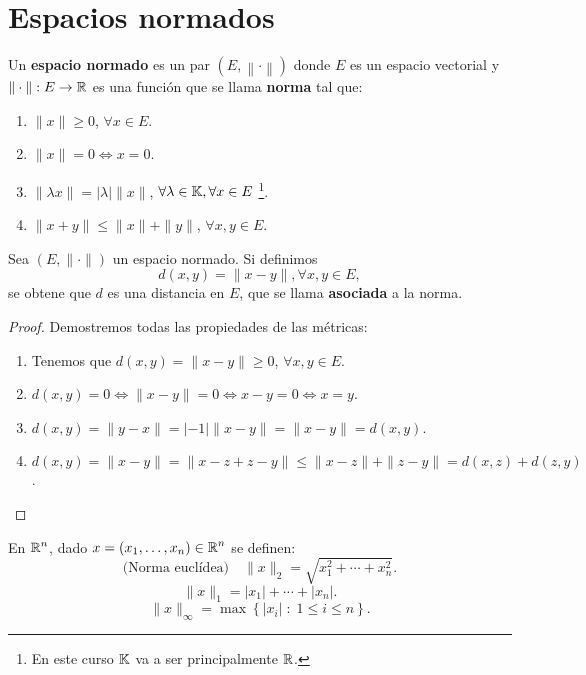 \section{Espacios normados}
\begin{definition}
Un \textbf{espacio normado} es un par $\displaystyle \left(E, \left\| \cdot \right\|\right) $ donde $\displaystyle E $ es un espacio vectorial y $\displaystyle \| \cdot \| : E \to \mathbb{R} $ es una función que se llama \textbf{norma} tal que:
\begin{enumerate}
\item $\displaystyle \| x \| \geq 0 $, $\displaystyle \forall x \in E $.
\item $\displaystyle \| x \| = 0 \iff x = 0 $.
\item $\displaystyle \| \lambda x \| = \left|\lambda \right|\|x\| $, $\displaystyle \forall \lambda \in \mathbb{K}, \forall x \in E $ \footnote{En este curso $\displaystyle \mathbb{K} $ va a ser principalmente $\displaystyle \mathbb{R} $.}.
\item $\displaystyle \| x + y \| \leq \| x \| + \| y \|$, $\displaystyle \forall x,y \in E $.
\end{enumerate}
\end{definition}
\begin{prop}
Sea $\displaystyle \left(E, \| \cdot \|\right) $ un espacio normado. Si definimos 
\[d\left(x,y\right) = \| x- y\|, \forall x,y \in E ,\]
se obtene que $\displaystyle d $ es una distancia en $\displaystyle E $, que se llama \textbf{asociada} a la norma. 
\end{prop}
\begin{proof}
Demostremos todas las propiedades de las métricas:
\begin{enumerate}
\item Tenemos que $\displaystyle d\left(x,y\right) = \|x-y\| \geq 0 $, $\displaystyle \forall x,y \in E $.
\item $\displaystyle d\left(x,y\right) = 0 \iff \|x-y\|=0\iff x - y = 0 \iff x = y $.
\item $\displaystyle d\left(x,y\right) = \|y - x\| = \left|-1\right| \|x-y\| = \|x-y\| = d\left(x,y\right) $.
\item $\displaystyle d\left(x,y\right) = \| x- y\| = \|x-z + z- y\| \leq \|x - z\| + \|z - y\| = d\left(x,z\right) + d\left(z,y\right) $.
\end{enumerate}
\end{proof}
\begin{observation}
En $\displaystyle \mathbb{R}^{n} $, dado $\displaystyle x = \left(x_{1}, \ldots, x_{n}\right) \in \mathbb{R}^{n} $ se definen:
\[ \text{(Norma euclídea)} \quad \|x\|_{2} = \sqrt{x^{2}_{1} + \cdots + x^{2}_{n}} .\]
\[\|x\|_{1} = \left|x_{1}\right| + \cdots + \left|x_{n}\right| .\]
\[ \|x\|_{\infty} = \max \left\{ \left|x_{i}\right| \; : \; 1 \leq i \leq n\right\}  .\]
\end{observation}
